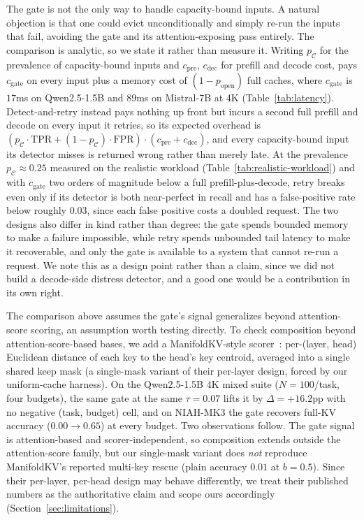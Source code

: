 The gate is not the only way to handle capacity-bound inputs. A natural
objection is that one could evict unconditionally and simply re-run the
inputs that fail, avoiding the gate and its attention-exposing pass
entirely. The comparison is analytic, so we state it rather than measure
it. Writing $p_{\mathcal{C}}$ for the prevalence of capacity-bound inputs
and $c_{\mathrm{pre}}$, $c_{\mathrm{dec}}$ for prefill and decode cost,
\method pays $c_{\mathrm{gate}}$ on every input plus a memory cost of
$(1 - p_{\text{open}})$ full caches, where $c_{\mathrm{gate}}$ is $17$ms
on Qwen2.5-1.5B and $89$ms on Mistral-7B at 4K (Table~\ref{tab:latency}).
Detect-and-retry instead pays nothing up front but incurs a second full
prefill and decode on every input it retries, so its expected overhead is
$(p_{\mathcal{C}} \cdot \mathrm{TPR} + (1 - p_{\mathcal{C}}) \cdot
\mathrm{FPR}) \cdot (c_{\mathrm{pre}} + c_{\mathrm{dec}})$, and every
capacity-bound input its detector misses is returned wrong rather than
merely late. At the prevalence $p_{\mathcal{C}} \approx 0.25$ measured on
the realistic workload (Table~\ref{tab:realistic-workload}) and with
$c_{\mathrm{gate}}$ two orders of magnitude below a full
prefill-plus-decode, retry breaks even only if its detector is both
near-perfect in recall and has a false-positive rate below roughly
$0.03$, since each false positive costs a doubled request. The two
designs also differ in kind rather than degree: the gate spends bounded
memory to make a failure impossible, while retry spends unbounded tail
latency to make it recoverable, and only the gate is available to a
system that cannot re-run a request. We note this as a design point
rather than a claim, since we did not build a decode-side distress
detector, and a good one would be a contribution in its own right.

The comparison above assumes the gate's signal generalizes beyond
attention-score scoring, an assumption worth testing directly. To check
composition beyond attention-score-based bases, we add a ManifoldKV-style
scorer~\citep{arxiv260208343}: per-(layer, head) Euclidean distance of
each key to the head's key centroid, averaged into a single shared keep
mask (a single-mask variant of their per-layer design, forced by our
uniform-cache harness). On the Qwen2.5-1.5B 4K mixed suite ($N =
100$/task, four budgets), the same gate at the same $\tau = 0.07$ lifts
it by $\Delta = +16.2$pp with no negative (task, budget) cell, and on
NIAH-MK3 the gate recovers full-KV accuracy ($0.00 \to 0.65$) at every
budget. Two observations follow. The gate signal is attention-based and
scorer-independent, so composition extends outside the attention-score
family, but our single-mask variant does \emph{not} reproduce
ManifoldKV's reported multi-key rescue (plain accuracy $0.01$ at $b =
0.5$). Since their per-layer, per-head design may behave differently, we
treat their published numbers as the authoritative claim and scope ours
accordingly (Section~\ref{sec:limitations}).


